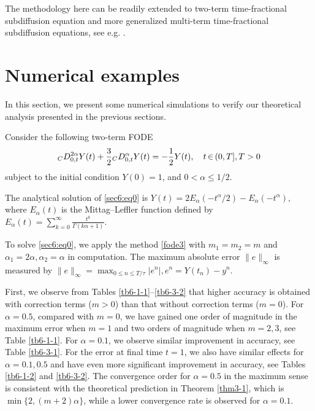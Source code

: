 \documentclass[10pt]{siamltex}
\begin{document}
\begin{remark}
The methodology here can be readily  extended to
  two-term time-fractional subdiffusion equation and
more generalized multi-term time-fractional subdiffusion equations,
see e.g. \cite{JinLaz-etal15,Liu-etal13,RenSun14}.
\end{remark}


\section{Numerical examples}\label{sec:numerical}
In this section, we present some numerical simulations to verify our theoretical analysis presented in the previous sections.
\begin{example}\label{s6eg0}
Consider the following two-term FODE
\begin{equation}\label{sec6:eq0}
{}_{C}D^{2\alpha}_{0,t}Y(t)+\frac{3}{2}{}_{C}D^{\alpha}_{0,t}Y(t)=-\frac{1}{2}Y(t),{\quad}t{\,\in\,}
 {(0,T],T>0}\\
\end{equation}
subject to the initial condition $Y(0)=1$,   and $0<\alpha\leq1/2$.
\end{example}
The analytical solution of \eqref{sec6:eq0} is
$Y(t)=2E_{\alpha}(-t^{\alpha}/2)-E_{\alpha}(-t^{\alpha}),$
where      $E_{\alpha}(t)$ is the Mittag--Leffler function defined by
$E_{\alpha}(t)=\sum_{k=0}^{\infty}\frac{t^{k}}{\Gamma(k\alpha+1)}.$



To solve \eqref{sec6:eq0}, we apply the method  \eqref{fode3}  with $m_1=m_2=m$ and $\alpha_1=2\alpha,\alpha_2=\alpha$ in computation.
%
The maximum absolute error $\|e\|_{\infty}$  is measured by
$\|e\|_{\infty}=\max_{0\leq n \leq T/\tau}|e^n|,  e^n=Y(t_n)-y^n.$


First, we observe from Tables \ref{tb6-1-1}--\ref{tb6-3-2} that higher accuracy is obtained
with correction terms ($m>0$) than that without correction terms ($m=0$).
For $\alpha=0.5$, compared with $m=0$, we have gained one order of  magnitude in the maximum error when $m=1$ and  two orders of  magnitude when $m=2,3$, see Table  \ref{tb6-1-1}.  For
$\alpha=0.1$, we observe similar improvement in accuracy, see Table \ref{tb6-3-1}.
For the error at final time $t=1$, we also have similar effects  for
$\alpha=0.1,0.5$ and have even more significant improvement in accuracy, see Tables  \ref{tb6-1-2} and \ref{tb6-3-2}. The convergence order  for $\alpha=0.5$ in the maximum sense is  consistent with the theoretical prediction in Theorem  \ref{thm3-1}, which is $\min\{2,{(m+2)\alpha}\}$, while a lower convergence rate is observed  for $\alpha=0.1$.
\end{document}
